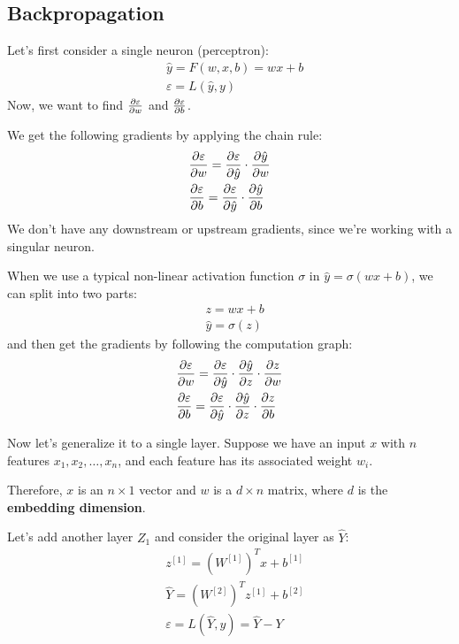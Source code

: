 \subsection{Backpropagation}
Let's first consider a single neuron (perceptron):
\begin{align*}
    & \hat{y} = F(w, x, b) = wx + b \\
    & \varepsilon = L(\hat{y}, y)    
\end{align*}
Now, we want to find $\frac{\partial \varepsilon}{\partial w}$ and $\frac{\partial \varepsilon}{\partial b}$.

We get the following gradients by applying the chain rule:
\begin{align*}
    & \frac{\partial \varepsilon}{\partial w}
    = \frac{\partial \varepsilon}{\partial \hat{y}} \cdot \frac{\partial \hat{y}}{\partial w} \\
    & \frac{\partial \varepsilon}{\partial b}
    = \frac{\partial \varepsilon}{\partial \hat{y}} \cdot \frac{\partial \hat{y}}{\partial b}
\end{align*}
We don't have any downstream or upstream gradients, since we're working with a singular neuron.

When we use a typical non-linear activation function $\sigma$ in $\hat{y} = \sigma(wx + b)$,
we can split into two parts:
\begin{align*}
    & z = wx + b \\
    & \hat{y} = \sigma(z)
\end{align*}
and then get the gradients by following the computation graph:
\begin{align*}
    & \frac{\partial \varepsilon}{\partial w}
    = \frac{\partial \varepsilon}{\partial \hat{y}}
    \cdot \frac{\partial \hat{y}}{\partial z}
    \cdot \frac{\partial z}{\partial w} \\
    & \frac{\partial \varepsilon}{\partial b}
    = \frac{\partial \varepsilon}{\partial \hat{y}}
    \cdot \frac{\partial \hat{y}}{\partial z}
    \cdot \frac{\partial z}{\partial b}
\end{align*}

Now let's generalize it to a single layer. Suppose we have an input $x$ with $n$ features
$x_1, x_2, \dots, x_n$, and each feature has its associated weight $w_i$.

Therefore, $x$ is an $n \times 1$ vector and $w$ is a $d \times n$ matrix, where $d$
is the \textbf{embedding dimension}.

Let's add another layer $Z_1$ and consider the original layer as $\hat{Y}$:
\begin{align*}
    & z^{[1]} = (W^{[1]})^T x + b^{[1]} \\
    & \hat{Y} = (W^{[2]})^T z^{[1]} + b^{[2]} \\
    & \varepsilon = L(\hat{Y}, y) = \hat{Y} - Y
\end{align*}

